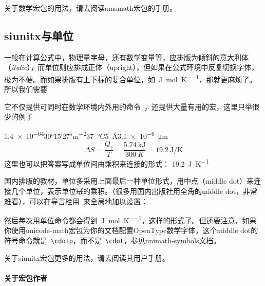 \documentclass[a4paper,UTF8,zihao = -4]{ctexart} %
\begin{document}
关于数学宏包的用法，请去阅读\textsf{amsmath}宏包的手册。


\subsection{\textsf{siunitx}与单位}
\label{sec:unitPkg}

一般在计算公式中，物理量字母，还有数学变量等，应排版为倾斜的意大利体（\textit{italic}），而单位则应排成正体（upright），但如果在公式环境中反复切换字体，极为不便。而如果排版有上下标的复合单位，如~\si{\joule\per\mole\per\kelvin}，那就更麻烦了。所以我们需要

\begin{dispListing}
\usepackage{siunitx} %
\end{dispListing}
它不仅提供可同时在数学环境内外用的命令~，还提供大量有用的宏，这里只举很少的例子

\begin{dispExample}
\num{1.4e-64}\quad \ang{30;15;27}\quad \si{m^{-2}}\quad \SI{37}{\celsius}\quad \SI{5}{\angstrom}\quad \SI{3.1e-6}{\micro\meter}
\[
  \Delta S = \dfrac{Q_r}{T} = \dfrac{\SI{5.74}{\kilo\joule}}{\SI{300}{K}} = \SI{19.2}{\joule\per\kelvin}
\]
这里也可以把答案写成单位间由乘积来连接的形式：
\SI[inter-unit-product = \ensuremath{{}\cdot{}}]{19.2}{\joule\per\kelvin}
\end{dispExample}

国内排版的教材，单位多采用上面最后一种单位形式，用中点（middle dot）来连接几个单位，表示单位幂的乘积。（很多用国内出版社用全角的middle dot，非常难看），可以在导言栏用~来全局地加以设置：

\begin{dispListing}
\usepackage{situnix} %
\end{dispListing}

然后每次用单位命令都会得到~\si[inter-unit-product = \ensuremath{{}\cdot{}}]{\joule\per\mole\per\kelvin}，这样的形式了。但还要注意，如果你使用\textsf{unicode-math}宏包为你的文档配置OpenType数学字体，这个middle dot的符号命令就是~\verb|\cdotp|，而不是~\verb|\cdot|，参见\textsf{unimath-symbols}文档。

关于\textsf{siunitx}宏包更多的用法，请去阅读其用户手册。

\paragraph{关于宏包作者}
\end{document}

